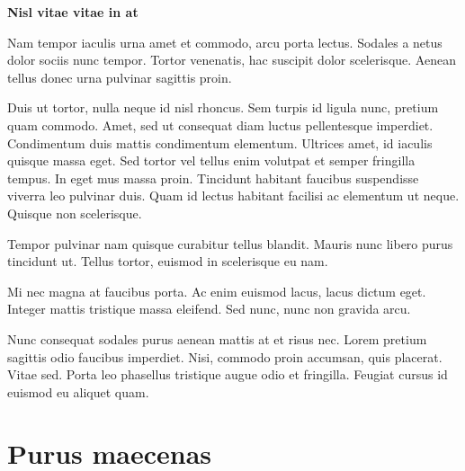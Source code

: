 \documentclass[
]{HyperedReport}
\begin{document}

\begin{fullwidth} %
		{\ttfamily\fontsize{16pt}{22.4pt}\selectfont\bfseries Nisl vitae vitae in at\par}
	\endminipage
	\hfill %
		\vspace{-\baselineskip-8pt} %
		Nam tempor iaculis urna amet et commodo, arcu porta lectus. Sodales a netus dolor sociis nunc tempor. Tortor venenatis, hac suscipit dolor scelerisque. Aenean tellus donec urna pulvinar sagittis proin.
		
		Duis ut tortor, nulla neque id nisl rhoncus. Sem turpis id ligula nunc, pretium quam commodo. Amet, sed ut consequat diam luctus pellentesque imperdiet. Condimentum duis mattis condimentum elementum. Ultrices amet, id iaculis quisque massa eget. Sed tortor vel tellus enim volutpat et semper fringilla tempus. In eget mus massa proin. Tincidunt habitant faucibus suspendisse viverra leo pulvinar duis. Quam id lectus habitant facilisi ac elementum ut neque. Quisque non scelerisque.
	
		Tempor pulvinar nam quisque curabitur tellus blandit. Mauris nunc libero purus tincidunt ut. Tellus tortor, euismod in scelerisque eu nam.
		
		Mi nec magna at faucibus porta. Ac enim euismod lacus, lacus dictum eget. Integer mattis tristique massa eleifend. Sed nunc, nunc non gravida arcu.
		
		Nunc consequat sodales purus aenean mattis at et risus nec. Lorem pretium sagittis odio faucibus imperdiet. Nisi, commodo proin accumsan, quis placerat. Vitae sed. Porta leo phasellus tristique augue odio et fringilla. Feugiat cursus id euismod eu aliquet quam.
	\endminipage
\end{fullwidth}

\newpage


\section{Purus maecenas}
\end{document}
